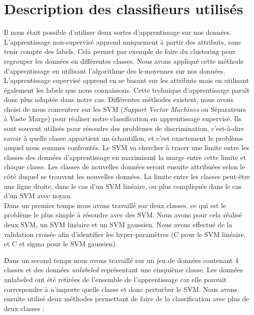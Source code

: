\section{Description des classifieurs utilisés}

	Il nous était possible d'utiliser deux sortes d'apprentissage sur nos données. L'apprentissage non-supervisé apprend uniquement à partir des attributs, sans tenir compte des labels. Cela permet par exemple de faire du clustering pour regrouper les données en différentes classes. Nous avons appliqué cette méthode d'apprentissage en utilisant l'algorithme des k-moyennes sur nos données.\\

	L'apprentissage supervisé apprend en se basant sur les attributs mais en utilisant également les labels que nous connaissons. Cette technique d'apprentissage paraît donc plus adaptée dans notre cas. Différentes méthodes existent, nous avons choisi de nous concentrer sur les SVM (\emph{Support Vector Machines} ou Séparateurs à Vaste Marge) pour réaliser notre classification en apprentissage supervisé. Ils sont souvent utilisés pour résoudre des problèmes de discrimination, c'est-à-dire savoir à quelle classe appartient un échantillon, et c'est exactement le problème auquel nous sommes confrontés. Le SVM va chercher à tracer une limite entre les classes des données d'apprentissage en maximisant la marge entre cette limite et chaque classe. Les classes de nouvelles données seront ensuite attribuées selon le côté duquel se trouvent les nouvelles données. La limite entre les classes peut-être une ligne droite, dans le cas d'un SVM linéaire, ou plus compliquée dans le cas d'un SVM avec noyau.\\

	Dans un premier temps nous avons travaillé sur deux classes, ce qui est le problème le plus simple à résoudre avec des SVM. Nous avons pour cela réalisé deux SVM, un SVM linéaire et un SVM gaussien. Nous avons effectué de la validation croisée afin d'identifier les hyper-paramètres (C pour le SVM linéaire, et C et sigma pour le SVM gaussien).

	Dans un second temps nous avons travaillé sur un jeu de données contenant 4 classes et des données \emph{unlabeled} représentant une cinquième classe. Les données unlabeled ont été retirées de l'ensemble de l'apprentissage car elle pouvait correspondre à n'importe quelle classe et donc perturber le SVM.
	Nous avons ensuite utilisé deux méthodes permettant de faire de la classification avec plus de deux classes :

